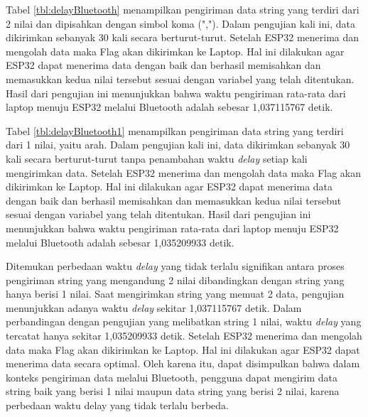 Tabel \ref{tbl:delayBluetooth} menampilkan pengiriman data string yang terdiri dari 2 nilai dan dipisahkan dengan simbol koma (","). Dalam pengujian kali ini, data dikirimkan sebanyak 30 kali secara berturut-turut. Setelah ESP32 menerima dan mengolah data maka Flag akan dikirimkan ke Laptop. Hal ini dilakukan agar ESP32 dapat menerima data dengan baik dan berhasil memisahkan dan memasukkan kedua nilai tersebut sesuai dengan variabel yang telah ditentukan. Hasil dari pengujian ini menunjukkan bahwa waktu pengiriman rata-rata dari laptop menuju ESP32 melalui Bluetooth adalah sebesar 1,037115767 detik.

Tabel \ref{tbl:delayBluetooth1} menampilkan pengiriman data string yang terdiri dari 1 nilai, yaitu arah. Dalam pengujian kali ini, data dikirimkan sebanyak 30 kali secara berturut-turut tanpa penambahan waktu \emph{delay} setiap kali mengirimkan data. Setelah ESP32 menerima dan mengolah data maka Flag akan dikirimkan ke Laptop. Hal ini dilakukan agar ESP32 dapat menerima data dengan baik dan berhasil memisahkan dan memasukkan kedua nilai tersebut sesuai dengan variabel yang telah ditentukan. Hasil dari pengujian ini menunjukkan bahwa waktu pengiriman rata-rata dari laptop menuju ESP32 melalui Bluetooth adalah sebesar 1,035209933 detik.

Ditemukan perbedaan waktu \emph{delay} yang tidak terlalu signifikan antara proses pengiriman string yang mengandung 2 nilai dibandingkan dengan string yang hanya berisi 1 nilai. Saat mengirimkan string yang memuat 2 data, pengujian menunjukkan adanya waktu \emph{delay} sekitar 1,037115767 detik. Dalam perbandingan dengan pengujian yang melibatkan string 1 nilai, waktu \emph{delay} yang tercatat hanya sekitar 1,035209933 detik. Setelah ESP32 menerima dan mengolah data maka Flag akan dikirimkan ke Laptop. Hal ini dilakukan agar ESP32 dapat menerima data secara optimal. Oleh karena itu, dapat disimpulkan bahwa dalam konteks pengiriman data melalui Bluetooth, pengguna dapat mengirim data string baik yang berisi 1 nilai maupun data string yang berisi 2 nilai, karena perbedaan waktu delay yang tidak terlalu berbeda.

